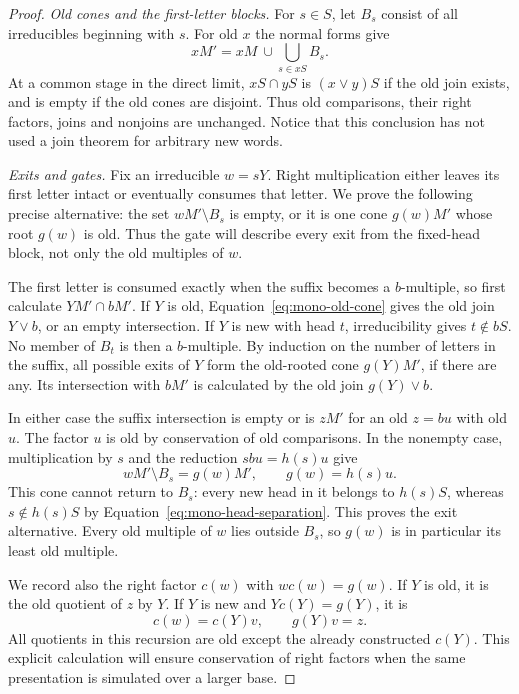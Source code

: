 \begin{proof}
\smallskip\noindent\textit{Old cones and the first-letter blocks.}
For $s\in S$, let $B_s$ consist of all irreducibles beginning with $s$.
For old $x$ the normal forms give
\begin{equation}\label{eq:mono-old-cone}
 xM'=xM\ \cup\!\bigcup_{s\in xS}B_s.
\end{equation}
At a common stage in the direct limit,
$xS\cap yS$ is $(x\vee y)S$ if the old join exists, and is empty
if the old cones are disjoint.  Thus old comparisons, their right
factors, joins and nonjoins are unchanged.  Notice that this conclusion
has not used a join theorem for arbitrary new words.

\smallskip\noindent\textit{Exits and gates.}
Fix an irreducible $w=sY$.  Right multiplication either leaves its
first letter intact or eventually consumes that letter.  We prove the
following precise alternative: the set $wM'\setminus B_s$ is empty,
or it is one cone $g(w)M'$ whose root $g(w)$ is old.  Thus the gate
will describe every exit from the fixed-head block, not only the old
multiples of $w$.

The first letter is consumed exactly when the suffix becomes a
$b$-multiple, so first calculate $YM'\cap bM'$.  If $Y$ is old,
Equation~\eqref{eq:mono-old-cone} gives the old join $Y\vee b$,
or an empty intersection.  If $Y$ is new with head $t$,
irreducibility gives $t\notin bS$.  No member of $B_t$ is then a
$b$-multiple.  By induction on the number of letters in the suffix,
all possible exits of $Y$ form the old-rooted cone $g(Y)M'$, if
there are any.  Its intersection with $bM'$ is calculated by the
old join $g(Y)\vee b$.

In either case the suffix intersection is empty or is $zM'$ for
an old $z=bu$ with old $u$.  The factor $u$ is old by conservation
of old comparisons.  In the nonempty case, multiplication by $s$
and the reduction $sbu=h(s)u$ give
\begin{equation}\label{eq:mono-gate-formula}
 wM'\setminus B_s=g(w)M',\qquad g(w)=h(s)u.
\end{equation}
This cone cannot return to $B_s$: every new head in it belongs to
$h(s)S$, whereas $s\notin h(s)S$ by
Equation~\eqref{eq:mono-head-separation}.  This proves the exit
alternative.  Every old multiple of $w$ lies outside $B_s$, so
$g(w)$ is in particular its least old multiple.

We record also the right factor $c(w)$ with $wc(w)=g(w)$.
If $Y$ is old, it is the old quotient of $z$ by $Y$.
If $Y$ is new and $Yc(Y)=g(Y)$, it is
\begin{equation}\label{eq:mono-gate-quotient}
 c(w)=c(Y)v,
 \qquad g(Y)v=z.
\end{equation}
All quotients in this recursion are old except the already constructed
$c(Y)$.  This explicit calculation will ensure conservation of right
factors when the same presentation is simulated over a larger base.


\end{proof}
